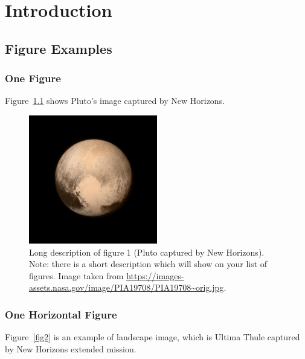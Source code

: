 \chapter{Introduction}
\label{chap:intro}
\section{Figure Examples}
\subsection{One Figure}
Figure~\ref{fig1} shows Pluto's image captured by New Horizons. 
\begin{figure}[htb!]
\center
\includegraphics[width=0.5\textwidth]{figures/PIA19708-orig.jpg}
\caption[Short description of the figure 1.1.]{Long description of figure 1 (Pluto captured by New Horizons). Note: there is a short description which will show on your list of figures. Image taken from \url{https://images-assets.nasa.gov/image/PIA19708/PIA19708~orig.jpg}.}
\label{fig1}
\end{figure}

\subsection{One Horizontal Figure}
Figure~\ref{fig2} is an example of landscape image, which is Ultima Thule captured by New Horizons extended mission.


